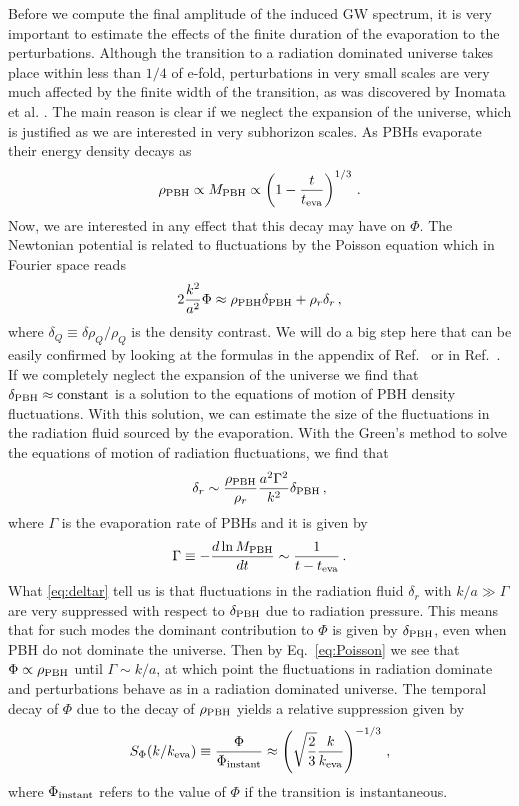 \documentclass[a4paper,11pt]{article}
\numberwithin{equation}{section}
\begin{document}
Before we compute the final amplitude of the induced GW spectrum, it is very important to estimate the effects of the finite duration of the evaporation to the perturbations. Although the transition to a radiation dominated universe takes place within less than $1/4$ of e-fold, perturbations in very small scales are very much affected by the finite width of the transition, as was discovered by Inomata et al. \cite{Inomata:2019zqy,Inomata:2019ivs,Inomata:2020lmk}. The main reason is clear if we neglect the expansion of the universe, which is justified as we are interested in very subhorizon scales. As PBHs evaporate their energy density decays as \cite{Inomata:2020lmk}
\begin{align}
\rho_{\rm PBH}\propto  M_{\rm PBH}\propto  \left(1-\frac{t}{t_{\rm eva}}\right)^{1/3}\,.
\end{align}
Now, we are interested in any effect that this decay may have on $\Phi$. The Newtonian potential is related to fluctuations by the Poisson equation which in Fourier space reads
\begin{align}\label{eq:Poisson}
2\frac{k^2}{a^2}\Phi\approx \rho_{\rm PBH}{\delta_{\rm PBH}}+\rho_r \delta_r\,,
\end{align}
where $\delta_Q\equiv \delta\rho_Q/\rho_Q$ is the density contrast. We will do a big step here that can be easily confirmed by looking at the formulas in the appendix of Ref.~\cite{Domenech:2020ssp} or in Ref.~\cite{Inomata:2020lmk}. If we completely neglect the expansion of the universe we find that $\delta_{\rm PBH}\approx {\rm constant}$ is a solution to the equations of motion of PBH density fluctuations. With this solution, we can estimate the size of the fluctuations in the radiation fluid sourced by the evaporation. With the Green's method to solve the equations of motion of radiation fluctuations, we find that 
\begin{align}\label{eq:deltar}
\delta_r\sim\frac{\rho_{\rm PBH}}{\rho_r}  \frac{a^2\Gamma^2}{k^2}\delta_{\rm PBH}\,,
\end{align}
where $\Gamma$ is the evaporation rate of PBHs and it is given by
\begin{align}
\Gamma\equiv -\frac{d\ln M_{\rm PBH}}{dt}\sim \frac{1}{t-t_{\rm eva}}\,.
\end{align}
What \eqref{eq:deltar} tell us is that fluctuations in the radiation fluid $\delta_r$  with $k/a\gg \Gamma$ are very suppressed with respect to $\delta_{\rm PBH}$ due to radiation pressure. This means that for such modes the dominant contribution to $\Phi$ is given by $\delta_{\rm PBH}$, even when PBH do not dominate the universe. Then by Eq.~\eqref{eq:Poisson} we see that $\Phi\propto \rho_{\rm PBH}$ until $\Gamma\sim k/a$, at which point the fluctuations in radiation dominate and perturbations behave as in a radiation dominated universe. The temporal decay of $\Phi$ due to the decay of $\rho_{\rm PBH}$ yields a relative suppression given by \cite{Inomata:2020lmk}
\begin{align}
S_\Phi(k/k_{\rm eva})\equiv \frac{\Phi}{\Phi_{\rm instant}}\approx \left(\sqrt{\frac{2}{3}}\frac{k}{k_{\rm eva}}\right)^{-1/3}\,,
\end{align}
where $\Phi_{\rm instant}$ refers to the value of $\Phi$ if the transition is instantaneous. 
\end{document}

